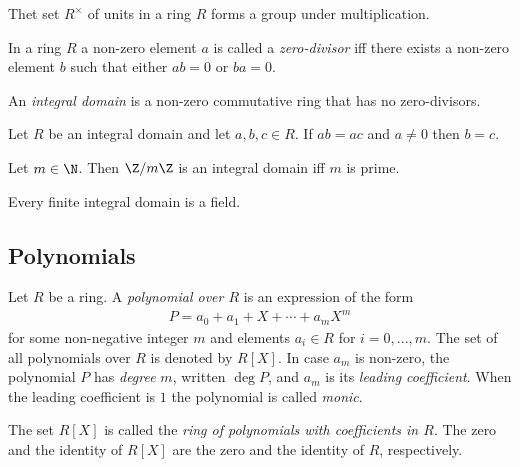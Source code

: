 \documentclass{article}
\begin{document}
\begin{proposition}
	Thet set $R^\times$ of units in a ring $R$ forms a group under multiplication.
\end{proposition}

\begin{definition}
	In a ring $R$ a non-zero element $a$ is called a \emph{zero-divisor} iff
	there exists a non-zero element $b$ such that either $ab=0$ or $ba=0$.
\end{definition}

\begin{definition}
	An \emph{integral domain} is a non-zero commutative ring that has no zero-divisors.
\end{definition}

\begin{proposition}[Proposition 3.2.15]
	Let $R$ be an integral domain and let $a,b,c\in R$. If $ab=ac$ and $a\not=0$
	then $b=c$.
\end{proposition}

\begin{proposition}[Proposition 3.2.16]
	Let $m\in\N$. Then $\Z/m\Z$ is an integral domain iff $m$ is prime.
\end{proposition}

\begin{theorem}[Theorem 3.2.17]
	Every finite integral domain is a field.
\end{theorem}

\subsection{Polynomials}

\begin{definition}
	Let $R$ be a ring. A \emph{polynomial over $R$} is an expression of the form
	\begin{align*}
		P=a_0+a_1+X+\cdots+a_mX^m
	\end{align*}
	for some non-negative integer $m$ and elements $a_i\in R$ for $i=0,...,m$.
	The set of all polynomials over $R$ is denoted by $R[X]$. In case $a_m$
	is non-zero, the polynomial $P$ has \emph{degree} $m$, written $\deg P$,
	and $a_m$ is its \emph{leading coefficient}. When the leading coefficient is
	$1$ the polynomial is called \emph{monic}.
\end{definition}

\begin{definition}
	The set $R[X]$ is called the \emph{ring of polynomials with coefficients
		in $R$}. The zero and the identity of $R[X]$ are the zero and the identity of
	$R$, respectively.
\end{definition}
\end{document}
